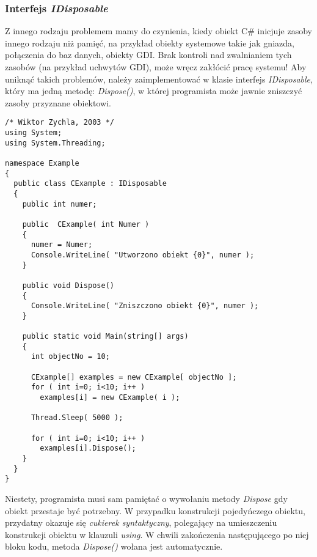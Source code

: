 \subsubsection{Interfejs {\em IDisposable}}

Z innego rodzaju problemem mamy do czynienia, kiedy obiekt C\# inicjuje zasoby innego 
rodzaju niż pamięć, na przykład obiekty systemowe takie jak gniazda, połączenia do baz danych, obiekty GDI.
Brak kontroli nad zwalnianiem tych zasobów (na przykład uchwytów GDI), może wręcz zakłócić pracę systemu!
Aby uniknąć takich problemów, należy zaimplementować w klasie interfejs {\em IDisposable}, który ma
jedną metodę: {\em Dispose()}, w której programista może jawnie zniszczyć zasoby przyznane obiektowi.

\begin{scriptsize}
\begin{verbatim}
/* Wiktor Zychla, 2003 */
using System;
using System.Threading;

namespace Example
{
  public class CExample : IDisposable
  {
    public int numer;

    public  CExample( int Numer )
    {
      numer = Numer;
      Console.WriteLine( "Utworzono obiekt {0}", numer );
    }

    public void Dispose()
    {
      Console.WriteLine( "Zniszczono obiekt {0}", numer );
    }

    public static void Main(string[] args)
    {
      int objectNo = 10;
      
      CExample[] examples = new CExample[ objectNo ];
      for ( int i=0; i<10; i++ )
        examples[i] = new CExample( i ); 

      Thread.Sleep( 5000 );

      for ( int i=0; i<10; i++ )
        examples[i].Dispose(); 
    }
  }
}
\end{verbatim}
\end{scriptsize}

Niestety, programista musi sam pamiętać o wywołaniu metody {\em Dispose} gdy obiekt przestaje być potrzebny.
W przypadku konstrukcji pojedyńczego obiektu, przydatny okazuje się {\em cukierek syntaktyczny}, polegający
na umieszczeniu konstrukcji obiektu w klauzuli {\em using}. W chwili zakończenia następującego po niej
bloku kodu, metoda {\em Dispose()} wołana jest automatycznie.

\label{disposeSyntaxSugar}

